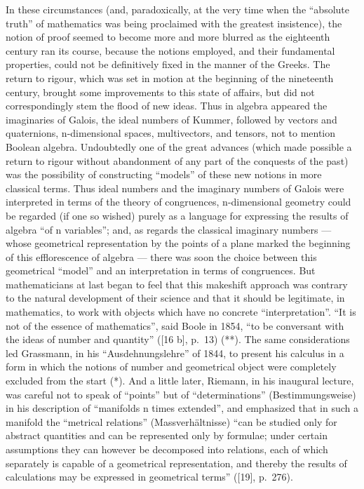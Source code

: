 In these circumstances (and, paradoxically, at the very time when the ``absolute truth'' of mathematics was being proclaimed with the greatest insistence), the notion of proof seemed to become more and more blurred as the eighteenth century ran its course, because the notions employed, and their fundamental properties, could not be definitively fixed in the manner of the Greeks. The return to rigour, which was set in motion at the beginning of the nineteenth century, brought some improvements to this state of affairs, but did not correspondingly stem the flood of new ideas. Thus in algebra appeared the imaginaries of Galois, the ideal numbers of Kummer, followed by vectors and quaternions, n-dimensional spaces, multivectors, and tensors, not to mention Boolean algebra. Undoubtedly one of the great advances (which made possible a return to rigour without abandonment of any part of the conquests of the past) was the possibility of constructing ``models'' of these new notions in more classical terms. Thus ideal numbers and the imaginary numbers of Galois were interpreted in terms of the theory of congruences, n-dimensional geometry could be regarded (if one so wished) purely as a language for expressing the results of algebra ``of n variables''; and, as regards the classical imaginary numbers --- whose geometrical representation by the points of a plane marked the beginning of this efflorescence of algebra --- there was soon the choice between this geometrical ``model'' and an interpretation in terms of congruences. But mathematicians at last began to feel that this makeshift approach was contrary to the natural development of their science and that it should be legitimate, in mathematics, to work with objects which have no concrete ``interpretation''. ``It is not of the essence of mathematics'', said Boole in 1854, ``to be conversant with the ideas of number and quantity'' ({[}16 b{]}, p.~13) (**). The same considerations led Grassmann, in his ``Ausdehnungslehre'' of 1844, to present his calculus in a form in which the notions of number and geometrical object were completely excluded from the start (*). And a little later, Riemann, in his inaugural lecture, was careful not to speak of ``points'' but of ``determinations'' (Bestimmungsweise) in his description of ``manifolds n times extended'', and emphasized that in such a manifold the ``metrical relations'' (Massverhältnisse) ``can be studied only for abstract quantities and can be represented only by formulae; under certain assumptions they can however be decomposed into relations, each of which separately is capable of a geometrical representation, and thereby the results of calculations may be expressed in geometrical terms'' ({[}19{]}, p.~276).

